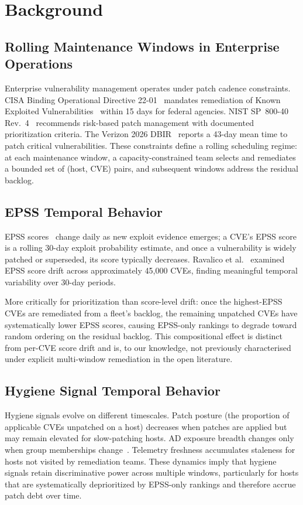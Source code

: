 \section{Background}

\subsection{Rolling Maintenance Windows in Enterprise Operations}

Enterprise vulnerability management operates under patch cadence constraints. CISA Binding Operational Directive 22-01~\cite{cisa2021bod2201} mandates remediation of Known Exploited Vulnerabilities~\cite{cisa2026kev} within 15 days for federal agencies. NIST SP~800-40 Rev.~4~\cite{nist2022sp80040r4} recommends risk-based patch management with documented prioritization criteria. The Verizon 2026 DBIR~\cite{verizon2026dbir} reports a 43-day mean time to patch critical vulnerabilities. These constraints define a rolling scheduling regime: at each maintenance window, a capacity-constrained team selects and remediates a bounded set of (host, CVE) pairs, and subsequent windows address the residual backlog.

\subsection{EPSS Temporal Behavior}

EPSS scores~\cite{jacobs2021epss} change daily as new exploit evidence emerges; a CVE's EPSS score is a rolling 30-day exploit probability estimate, and once a vulnerability is widely patched or superseded, its score typically decreases. Ravalico et al.~\cite{ravalico2025epsstemporal} examined EPSS score drift across approximately 45{,}000 CVEs, finding meaningful temporal variability over 30-day periods.

More critically for prioritization than score-level drift: once the highest-EPSS CVEs are remediated from a fleet's backlog, the remaining unpatched CVEs have systematically lower EPSS scores, causing EPSS-only rankings to degrade toward random ordering on the residual backlog. This compositional effect is distinct from per-CVE score drift and is, to our knowledge, not previously characterised under explicit multi-window remediation in the open literature.

\subsection{Hygiene Signal Temporal Behavior}

Hygiene signals evolve on different timescales. Patch posture (the proportion of applicable CVEs unpatched on a host) decreases when patches are applied but may remain elevated for slow-patching hosts. AD exposure breadth changes only when group memberships change~\cite{cisa2022bod2301}. Telemetry freshness accumulates staleness for hosts not visited by remediation teams. These dynamics imply that hygiene signals retain discriminative power across multiple windows, particularly for hosts that are systematically deprioritized by EPSS-only rankings and therefore accrue patch debt over time.
